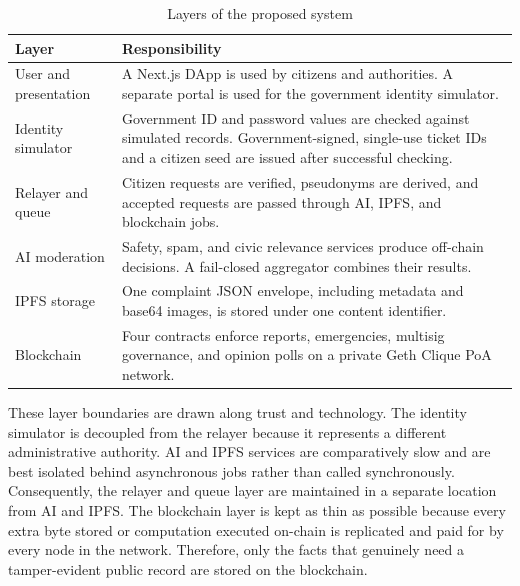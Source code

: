 \begin{table}[!htb]
    \centering
    \caption{Layers of the proposed system}
    \label{tab:architecture-layers}
    \small
    \begin{tabular}{p{}|p{}}
      
        Layer & Responsibility \\
        \hline
        User and presentation & A Next.js \ac{DApp} is used by citizens and authorities. A separate  portal is used for the government identity simulator. \\
        \hline
        Identity simulator & Government ID and password values are checked against simulated records. Government-signed, single-use ticket IDs and a citizen seed are issued after successful checking. \\
        \hline
        Relayer and queue & Citizen requests are verified, pseudonyms are derived, and accepted requests are passed through \ac{AI}, \ac{IPFS}, and blockchain jobs. \\
        \hline
        AI moderation & Safety, spam, and civic relevance services produce off-chain decisions. A fail-closed aggregator combines their results. \\
        \hline
        \ac{IPFS} storage & One complaint \ac{JSON} envelope, including metadata and base64 images, is stored under one content identifier. \\
        \hline
        Blockchain & Four contracts enforce reports, emergencies, multisig governance, and opinion polls on a private Geth Clique \ac{PoA} network. \\
        
    \end{tabular}
\end{table}

These layer boundaries are drawn along trust and technology. The identity simulator is decoupled from the relayer because it represents a different administrative authority. AI and IPFS services are comparatively slow and are best isolated behind asynchronous jobs rather than called synchronously. Consequently, the relayer and queue layer are maintained in a separate location from AI and IPFS. The blockchain layer is kept as thin as possible because every extra byte stored or computation executed on-chain is replicated and paid for by every node in the network. Therefore, only the facts that genuinely need a tamper-evident public record are stored on the blockchain.

